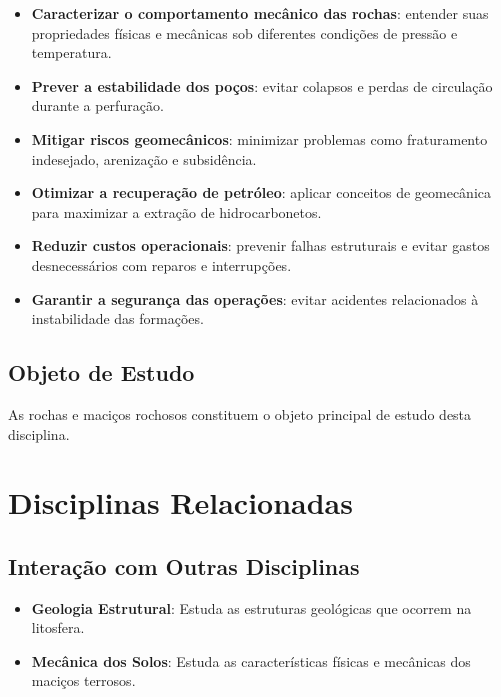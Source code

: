 \documentclass[12pt,a4paper,twoside]{book}
\begin{document}
\begin{itemize}
    \item \textbf{Caracterizar o comportamento mecânico das rochas}: entender suas propriedades 
    físicas e mecânicas sob diferentes condições de pressão e temperatura.
    
    \item \textbf{Prever a estabilidade dos poços}: evitar colapsos e perdas de circulação durante 
    a perfuração.
    
    \item \textbf{Mitigar riscos geomecânicos}: minimizar problemas como fraturamento indesejado, 
    arenização e subsidência.
    
    \item \textbf{Otimizar a recuperação de petróleo}: aplicar conceitos de geomecânica para 
    maximizar a extração de hidrocarbonetos.
    
    \item \textbf{Reduzir custos operacionais}: prevenir falhas estruturais e evitar gastos 
    desnecessários com reparos e interrupções.
    
    \item \textbf{Garantir a segurança das operações}: evitar acidentes relacionados à instabilidade 
    das formações.
\end{itemize}

\subsection{Objeto de Estudo}

As rochas e maciços rochosos constituem o objeto principal de estudo desta disciplina.

\section{Disciplinas Relacionadas}

\subsection{Interação com Outras Disciplinas}

\begin{itemize}
    \item \textbf{Geologia Estrutural}: Estuda as estruturas geológicas que ocorrem na litosfera.
    \item \textbf{Mecânica dos Solos}: Estuda as características físicas e mecânicas dos maciços terrosos.
\end{itemize}
\end{document}
